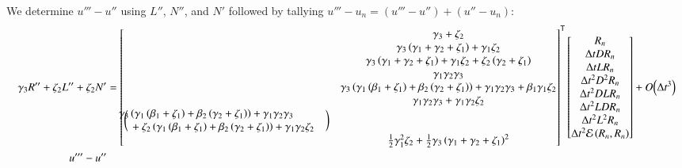 \documentclass[letterpaper,11pt]{amsart}
\newcommand{\trans}[1]{{#1}^{\ensuremath{\mathsf{T}}}}
\newcommand{\order}[2]{\ensuremath{O\!\left( {#1}^{#2} \right)}}
\begin{document}
We determine $u'''-u''$ using $L''$, $N''$, and $N'$ followed by tallying
$u'''-u_{n} = (u'''-u'')+(u''-u_{n})$:
\begin{align}
      \gamma_{3} R''
    + \zeta_{2}  L''
    + \zeta_{2}  N'
  &=
\trans{\begin{bmatrix}
  &\gamma_{3} + \zeta_{2} \\
    &\gamma_{3} \left( \gamma_{1} + \gamma_{2} + \zeta_{1} \right)
  + \gamma_{1} \zeta_{2} \\
    &\gamma_{3} \left( \gamma_{1} + \gamma_{2} + \zeta_{1} \right)
  + \gamma_{1} \zeta_{2}
  + \zeta_{2} \left( \gamma_{2} + \zeta_{1} \right) \\
  &\gamma_{1} \gamma_{2} \gamma_{3} \\
    &\gamma_{3} \left(
       \gamma_{1} \left(\beta_{1}+\zeta_{1}\right)
      +\beta_{2} \left(\gamma_{2}+\zeta_{1}\right)
    \right)
  + \gamma_{1} \gamma_{2} \gamma_{3}
  + \beta_{1} \gamma_{1} \zeta_{2} \\
    &\gamma_{1} \gamma_{2} \gamma_{3}
  + \gamma_{1} \gamma_{2} \zeta_{2} \\
%
\bigg(\mspace{-18mu}
\begin{split}
    &\gamma_{3} \left(
       \gamma_{1} \left(\beta_{1}+\zeta_{1}\right)
      +\beta_{2} \left(\gamma_{2}+\zeta_{1}\right)
    \right)
  + \gamma_{1} \gamma_{2} \gamma_{3}
  \\
  &\quad+ \zeta_{2} \left(
       \gamma_{1} \left(\beta_{1}+\zeta_{1}\right)
      +\beta_{2} \left(\gamma_{2}+\zeta_{1}\right)
    \right)
  + \gamma_{1} \gamma_{2} \zeta_{2}
\end{split}
\mspace{18mu}\bigg)
  \\
%
    &\frac{1}{2}\gamma_{1}^{2}\zeta_{2}
  + \frac{1}{2}\gamma_{3}\left( \gamma_{1} + \gamma_{2} + \zeta_{1} \right)^{2}
\end{bmatrix}}
\begin{bmatrix}
  R_{n} \\
  \Delta{}t D R_{n} \\
  \Delta{}t L R_{n} \\
  \Delta{}t^{2} D^{2} R_{n} \\
  \Delta{}t^{2} D L R_{n} \\
  \Delta{}t^{2} L D R_{n} \\
  \Delta{}t^{2} L^{2} R_{n} \\
  \Delta{}t^{2} \mathcal{E}\left( R_{n}, R_{n} \right)
\end{bmatrix}
  + \order{\Delta{}t}{3}
\\
  u'''-u''

\end{align}
\end{document}
